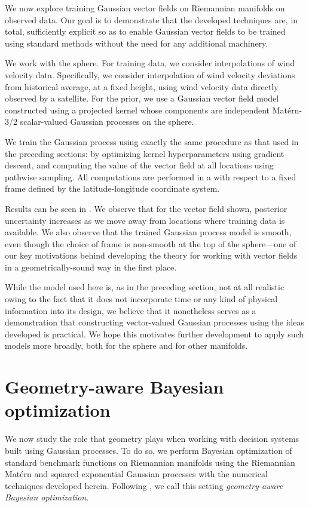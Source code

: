 \documentclass[11pt]{book}
\begin{document}
We now explore training Gaussian vector fields on Riemannian manifolds on observed data. 
Our goal is to demonstrate that the developed techniques are, in total, sufficiently explicit so as to enable Gaussian vector fields to be trained using standard methods without the need for any additional machinery.

We work with the sphere.
For training data, we consider interpolations of wind velocity data.
Specifically, we consider interpolation of wind velocity deviations from historical average, at a fixed height, using wind velocity data directly observed by a satellite.
For the prior, we use a Gaussian vector field model constructed using a projected kernel whose components are independent Matérn-3/2 scalar-valued Gaussian processes on the sphere.

We train the Gaussian process using exactly the same procedure as that used in the preceding sections: by optimizing kernel hyperparameters using gradient descent, and computing the value of the vector field at all locations using pathwise sampling.
All computations are performed in a with respect to a fixed frame defined by the latitude-longitude coordinate system.

Results can be seen in .
We observe that for the vector field shown, posterior uncertainty increases as we move away from locations where training data is available.
We also observe that the trained Gaussian process model is smooth, even though the choice of frame is non-smooth at the top of the sphere---one of our key motivations behind developing the theory for working with vector fields in a geometrically-sound way in the first place.

While the model used here is, as in the preceding section, not at all realistic owing to the fact that it does not incorporate time or any kind of physical information into its design, we believe that it nonetheless serves as a demonstration that constructing vector-valued Gaussian processes using the ideas developed is practical.
We hope this motivates further development to apply such models more broadly, both for the sphere and for other manifolds.

\section{Geometry-aware Bayesian optimization}

We now study the role that geometry plays when working with decision systems built using Gaussian processes.
To do so, we perform Bayesian optimization of standard benchmark functions on Riemannian manifolds using the Riemannian Matérn and squared exponential Gaussian processes with the numerical techniques developed herein.
Following \textcite{jaquier20}, we call this setting \emph{geometry-aware Bayesian optimization}.
\end{document}
